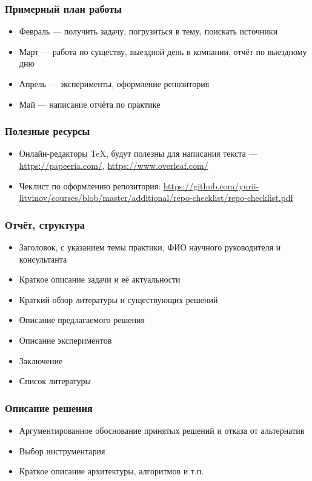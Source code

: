 \documentclass{../../slides-style}
\begin{document}
    \begin{frame}
        \frametitle{Примерный план работы}
        \begin{itemize}
            \item Февраль --- получить задачу, погрузиться в тему, поискать источники
            \item Март --- работа по существу, выездной день в компании, отчёт по выездному дню
            \item Апрель --- эксперименты, оформление репозитория
            \item Май --- написание отчёта по практике
        \end{itemize}
    \end{frame}

    \begin{frame}
        \frametitle{Полезные ресурсы}
        \begin{itemize}
            \item Онлайн-редакторы TeX, будут полезны для написания текста --- \url{https://papeeria.com/}, \url{https://www.overleaf.com/}
            \item Чеклист по оформлению репозитория: \url{https://github.com/yurii-litvinov/courses/blob/master/additional/repo-checklist/repo-checklist.pdf}
        \end{itemize}
    \end{frame}

    \begin{frame}
        \frametitle{Отчёт, структура}
        \begin{itemize}
            \item Заголовок, с указанием темы практики, ФИО научного руководителя и консультанта
            \item Краткое описание задачи и её актуальности
            \item Краткий обзор литературы и существующих решений
            \item Описание предлагаемого решения
            \item Описание экспериментов
            \item Заключение
            \item Список литературы
        \end{itemize}
    \end{frame}

    \begin{frame}
        \frametitle{Описание решения}
        \begin{itemize}
            \item Аргументированное обоснование принятых решений и отказа от альтернатив
            \item Выбор инструментария
            \item Краткое описание архитектуры, алгоритмов и т.п.
        \end{itemize}
    \end{frame}
\end{document}
